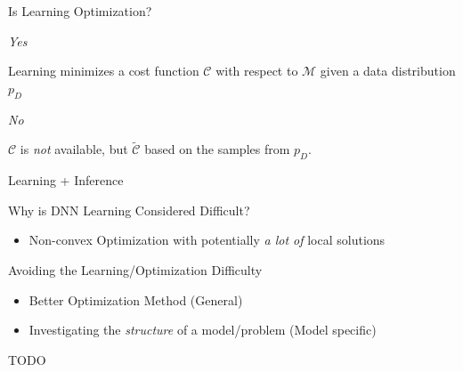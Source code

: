 \documentclass[first=dgreen,second=purple,logo=yellowexc]{aaltoslides}
\newcommand{\CC}[0]{\mathcal{C}}
\newcommand{\MM}[0]{\mathcal{M}}
\begin{document}
\begin{frame}{Is Learning Optimization?}

    \begin{minipage}{0.48\textwidth}
    \emph{Yes}

    Learning minimizes a cost function $\CC$ with respect to
    $\MM$ given a data distribution $p_D$

    \end{minipage}
    \hfill
    \begin{minipage}{0.48\textwidth}
    \emph{No}

    $\CC$ is \emph{not} available, but $\tilde{\CC}$ based
    on the samples from $p_D$.

    \end{minipage}

\end{frame}

\begin{frame}{Learning + Inference}

\end{frame}

\begin{frame}{Why is DNN Learning Considered Difficult?}

    \begin{itemize}
        \item Non-convex Optimization with potentially
            \emph{a lot of} local solutions
    \end{itemize}

\end{frame}

\begin{frame}{Avoiding the Learning/Optimization Difficulty}
    \begin{itemize}
        \item Better Optimization Method (General)
        \item Investigating the \emph{structure} of a
            model/problem (Model specific)
    \end{itemize}
\end{frame}


\begin{frame}{}
    \alert{TODO}
\end{frame}



\end{document}
